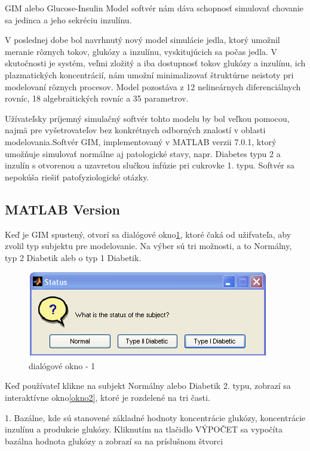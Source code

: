 
GIM alebo Glucose-Insulin Model softvér nám dáva schopnosť simulovať chovanie sa jedinca a jeho sekréciu inzulínu.\cite{2007}

V poslednej dobe bol navrhnutý nový model simulácie jedla, ktorý umožnil meranie rôznych tokov, glukózy a inzulínu, vyskitujúcich sa počas jedla. V skutočnosti je systém, veľmi zložitý a iba dostupnosť tokov glukózy a inzulínu, ich plazmatických koncentrácií, nám umožní minimalizovať štruktúrne neistoty pri modelovaní rôznych procesov. Model pozostáva z 12 nelineárnych diferenciálnych rovníc, 18 algebraitických rovníc a 35 parametrov.\cite{2007}

Užívateľsky príjemný simulačný softvér tohto modelu by bol veľkou pomocou, najmä pre vyšetrovateľov bez konkrétnych odborných znalostí v oblasti modelovania.Softvér GIM, implementovaný v MATLAB verzii 7.0.1, ktorý umožňuje simulovať normálne aj patologické stavy, napr. Diabetes typu 2 a inzulín s otvorenou a uzavretou slučkou infúzie pri cukrovke 1. typu. Softvér sa nepokúša riešiť patofyziologické otázky.\cite{2007}

\subsection{MATLAB Version}

Keď je GIM spustený, otvorí sa dialógové okno\ref{okno1}, ktoré čaká od užifvateľa, aby zvolil typ subjektu pre modelovanie. Na výber sú tri možnosti, a to Normálny, typ 2 Diabetik aleb o typ 1 Diabetik.

\begin{figure}[H]
\centering
\includegraphics[scale=1]{ob-1.PNG}
\caption{dialógové okno - 1 \cite{2007}}
\label{okno1}
\end{figure}

Keď používateľ klikne na subjekt Normálny alebo Diabetik 2. typu, zobrazí sa interaktívne okno\ref{okno2}, ktoré je rozdelené na tri časti. 

1. Bazálne, kde sú stanovené základné hodnoty koncentrácie glukózy, koncentrácie inzulínu a produkcie glukózy. Kliknutím na tlačidlo VÝPOČET sa vypočíta bazálna hodnota glukózy a zobrazí sa na príslušnom štvorci \cite{2007}

